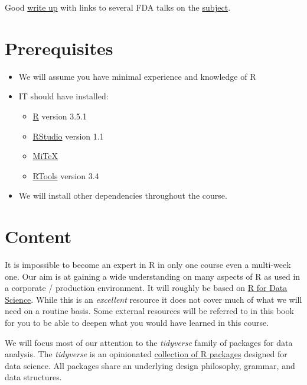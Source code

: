 \documentclass[]{book}
\providecommand{\tightlist}{%
  \setlength{\itemsep}{0pt}\setlength{\parskip}{0pt}}
\begin{document}
Good \href{http://blog.revolutionanalytics.com/2017/06/r-fda.html}{write
up} with links to several FDA talks on the
\href{https://thomaswdinsmore.com/2014/12/01/sas-versus-r-part-1/}{subject}.

\section{Prerequisites}\label{prerequisites}

\begin{itemize}
\tightlist
\item
  We will assume you have minimal experience and knowledge of R
\item
  IT should have installed:

  \begin{itemize}
  \tightlist
  \item
    \href{https://cran.r-project.org/}{R} version 3.5.1
  \item
    \href{https://www.rstudio.com/products/rstudio/download/\#download}{RStudio}
    version 1.1
  \item
    \href{https://miktex.org/}{MiTeX}
  \item
    \href{https://cran.r-project.org/bin/windows/Rtools/}{RTools}
    version 3.4
  \end{itemize}
\item
  We will install other dependencies throughout the course.
\end{itemize}

\section{Content}\label{content}

It is impossible to become an expert in R in only one course even a
multi-week one. Our aim is at gaining a wide understanding on many
aspects of R as used in a corporate / production environment. It will
roughly be based on \href{http://r4ds.had.co.nz}{R for Data Science}.
While this is an \emph{excellent} resource it does not cover much of
what we will need on a routine basis. Some external resources will be
referred to in this book for you to be able to deepen what you would
have learned in this course.

We will focus most of our attention to the \emph{tidyverse} family of
packages for data analysis. The \emph{tidyverse} is an opinionated
\href{https://www.tidyverse.org/packages/}{collection of R packages}
designed for data science. All packages share an underlying design
philosophy, grammar, and data structures.
\end{document}
